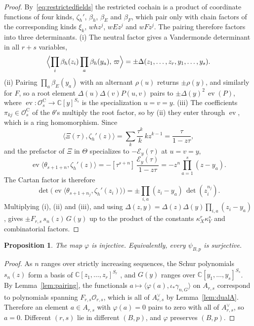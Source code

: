 \documentclass[11pt]{amsart}
\numberwithin{equation}{section}
\newtheorem{proposition}[theorem]{Proposition}
\theoremstyle{definition}
\theoremstyle{remark}
\newcommand{\C}{\mathbb{C}}
\newcommand{\cO}{\mathcal{O}}
\newcommand{\ev}{\operatorname{ev}}
\newcommand{\Car}{\mathrm{C}}
\begin{document}
\begin{proof}
By~\eqref{eq:restrictedfields} the restricted cochain is a product of coordinate functions of four kinds, $\zeta_h'$, $\beta_h$, $\beta_E$ and $\beta_F$, which pair only with chain factors of the corresponding kinds $\xi_k$, $whz^j$, $wEz^j$ and $wFz^j$. The pairing therefore factors into three determinants. (i) The neutral factor gives a Vandermonde determinant in all $r+s$ variables,
\begin{equation}\label{eq:neutral-pairing}
\Bigl\langle\prod_i\beta_h(z_i)\prod_a\beta_h(y_a),\,\varpi\Bigr\rangle=\pm\Delta(z_1,\dots,z_r,y_1,\dots,y_s).
\end{equation} (ii) Pairing $\prod_a\beta_E(y_a)$ with an alternant $\rho(u)$ returns $\pm\rho(y)$, and similarly for $F$, so a root element $\Delta(u)\Delta(v)P(u,v)$ pairs to $\pm\Delta(y)^2\,\ev(P)$, where $\ev:\cO^\Car_s\to\C[y]^{S_s}$ is the specialization $u=v=y$. (iii) The coefficients $\pi_{kj}\in\cO^\Car_s$ of the $\theta$'s multiply the root factor, so by (ii) they enter through $\ev$, which is a ring homomorphism. Since
\begin{equation}\label{eq:Xi-pairing}
\langle\Xi(\tau),\zeta_h'(z)\rangle=\sum_k\frac{\tau^k}{k}\,kz^{k-1}=\frac{\tau}{1-z\tau},
\end{equation}
and the prefactor of $\Xi$ in $\Theta$ specializes to $-\mathcal E_y(\tau)$ at $u=v=y$,
\begin{equation}\label{eq:cyclepairing}
\ev\langle\theta_{s+1+n},\zeta_h'(z)\rangle=-[\tau^{s+n}]\,\frac{\mathcal E_y(\tau)}{1-z\tau}=-z^n\prod_{a=1}^s(z-y_a).
\end{equation}
The Cartan factor is therefore
\begin{equation}\label{eq:Cartan-factor}
\det\bigl(\ev\langle\theta_{s+1+n_j},\zeta_h'(z_i)\rangle\bigr)=\pm\prod_{i,a}(z_i-y_a)\,\det(z_i^{n_j}).
\end{equation} Multiplying (i), (ii) and (iii), and using $\Delta(z,y)=\Delta(z)\Delta(y)\prod_{i,a}(z_i-y_a)$, gives $\pm F_{r,s}\,s_n(z)\,G(y)$ up to the product of the constants $\kappa_X^r\kappa_Y^s$ and combinatorial factors.
\end{proof}

\begin{proposition}\label{prop:injective}
The map $\varphi$ is injective. Equivalently, every $\psi_{B,p}$ is surjective.
\end{proposition}

\begin{proof}
As $n$ ranges over strictly increasing sequences, the Schur polynomials $s_n(z)$ form a basis of $\C[z_1,\dots,z_r]^{S_r}$ \cite[I.3]{Mac95}, and $G(y)$ ranges over $\C[y_1,\dots,y_s]^{S_s}$. By Lemma~\ref{lem:pairing}, the functionals $a\mapsto\langle\varphi(a),\iota_*\gamma_{n,G}\rangle$ on $A_{r,s}$ correspond to polynomials spanning $F_{r,s}\cO_{r,s}$, which is all of $A_{r,s}^\vee$ by Lemma~\ref{lem:dualA}. Therefore an element $a\in A_{r,s}$ with $\varphi(a)=0$ pairs to zero with all of $A^\vee_{r,s}$, so $a=0$. Different $(r,s)$ lie in different $(B,p)$, and $\varphi$ preserves $(B,p)$.
\end{proof}
\end{document}
